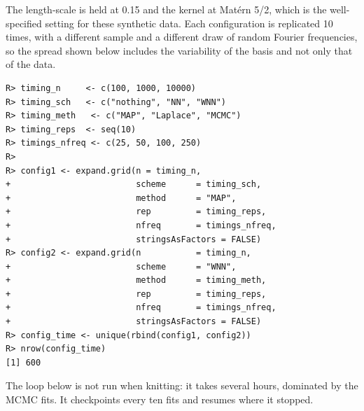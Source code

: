 \documentclass[
]{article}
\begin{document}
The length-scale is held at 0.15 and the kernel at Matérn 5/2, which is the well-specified setting for these synthetic data. Each configuration is replicated 10 times, with a different sample and a different draw of random Fourier frequencies, so the spread shown below includes the variability of the basis and not only that of the data.

\begin{verbatim}
R> timing_n     <- c(100, 1000, 10000)
R> timing_sch   <- c("nothing", "NN", "WNN")
R> timing_meth   <- c("MAP", "Laplace", "MCMC")
R> timing_reps  <- seq(10)
R> timings_nfreq <- c(25, 50, 100, 250)
R> 
R> config1 <- expand.grid(n = timing_n,
+                         scheme      = timing_sch,
+                         method      = "MAP",
+                         rep         = timing_reps,
+                         nfreq       = timings_nfreq,
+                         stringsAsFactors = FALSE)
R> config2 <- expand.grid(n           = timing_n,
+                         scheme      = "WNN",
+                         method      = timing_meth,
+                         rep         = timing_reps,
+                         nfreq       = timings_nfreq,
+                         stringsAsFactors = FALSE)
R> config_time <- unique(rbind(config1, config2))
R> nrow(config_time)
[1] 600
\end{verbatim}

The loop below is not run when knitting: it takes several hours, dominated by the MCMC
fits. It checkpoints every ten fits and resumes where it stopped.
\end{document}
